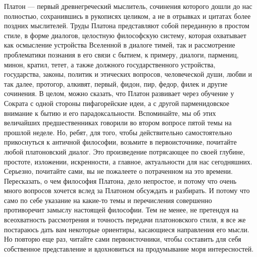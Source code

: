Платон — первый древнегреческий мыслитель, сочинения которого дошли до
нас полностью, сохранившись в рукописях целиком, а не в отрывках и цитатах более
поздних мыслителей. Труды Платона представляют собой переданную в простом стиле,
в форме диалогов, целостную философскую систему, которая охватывает как
осмысление устройства Вселенной в диалоге тимей, так и рассмотрение проблематики
познания в его связи с бытием, к примеру, диалоги, пармениц, минон, кратил,
тетет, а также должного государственного устройства, государства, законы,
политик и этических вопросов, человеческой души, любви и так далее, протогор,
алкивят, первый, фидон, пир, федор, филек и другие сочинения. В целом, можно
сказать, что Платон развивает через обучение у Сократа с одной стороны
пифагорейские идеи, а с другой парменидовское внимание к бытию и его
парадоксальности. Вспоминайте, мы об этих величайших предшественниках говорили
во втором вопросе пятой темы на прошлой неделе. Но, ребят, для того, чтобы
действительно самостоятельно прикоснуться к античной философии, возьмите в
первоисточнике, почитайте любой платоновский диалог. Это произведение
потрясающее по своей глубине, простоте, изложении, искренности, а главное,
актуальности для нас сегодняшних. Серьезно, почитайте сами, вы не пожалеете о
потраченном на это времени. Пересказать, о чем философия Платона, дело
непростое, и потому что очень много вопросов хочется вслед за Платоном обсуждать
и разбирать. И потому что само по себе указание на какие-то темы и перечисления
совершенно противоречит замыслу настоящей философии. Тем не менее, не претендуя
на всеохватность рассмотрения и точность передачи платоновского стиля, я все же
постараюсь дать вам некоторые ориентиры, касающиеся направления его мысли. Но
повторю еще раз, читайте сами первоисточники, чтобы составить для себя
собственное представление и вдохновиться на продумывание моря интересностей.

